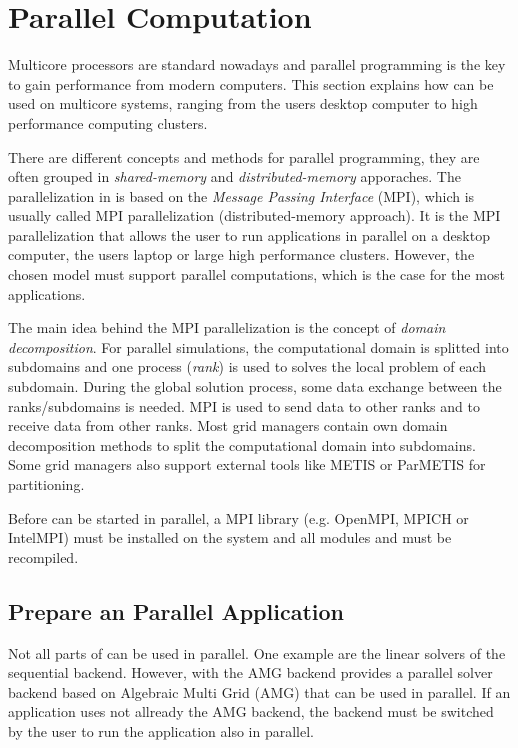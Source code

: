 \section{Parallel Computation}
\label{sec:parallelcomputation}
Multicore processors are standard nowadays and parallel programming is the key to gain
performance from modern computers. This section explains how \Dumux can be used 
on multicore systems, ranging from the users desktop computer to high performance
computing clusters.  

There are different concepts and methods for parallel programming, they are
often grouped in \textit{shared-memory} and \textit{distributed-memory}  
apporaches. The parallelization in \Dumux is based on the 
\textit{Message Passing Interface} (MPI), which is usually called MPI parallelization (distributed-memory approach). 
It is the MPI parallelization that allows the user to run
\Dumux applications in parallel on a desktop computer, the users laptop or 
large high performance clusters. However, the chosen \Dumux 
model must support parallel computations, which is the case for the most \Dumux applications.

The main idea behind the MPI parallelization is the concept of \textit{domain 
decomposition}. For parallel simulations, the computational domain is splitted into 
subdomains and one process (\textit{rank}) is used to solves the local problem of each 
subdomain. During the global solution process, some data exchange between the 
ranks/subdomains is needed. MPI is used to send data to other ranks and to receive 
data from other ranks. 
Most grid managers contain own domain decomposition methods to split the 
computational domain  into subdomains. Some grid managers also support external 
tools like METIS or ParMETIS for partitioning.

Before \Dumux can be started in parallel, a 
MPI library (e.g. OpenMPI, MPICH or IntelMPI) 
must be installed on the system and all \Dune modules and \Dumux must be recompiled.  


\subsection{Prepare an Parallel Application}
Not all parts of \Dumux can be used in parallel. One example are the linear solvers
of the sequential backend. However, with the AMG backend \Dumux provides 
a parallel solver backend based on Algebraic Multi Grid (AMG) that can be used in
parallel. 
If an application uses not allready the AMG backend, the 
backend must be switched by the user to run the application also in parallel.

